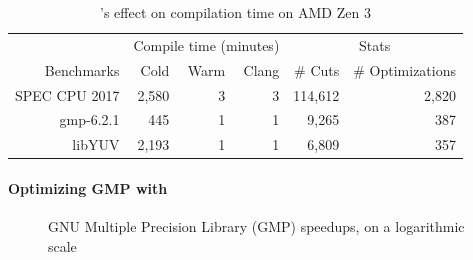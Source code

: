 \begin{table}[t]
  \centering
  \caption{\minotaur's effect on compilation time on AMD Zen 3}
  \begin{tabular}{r | r r r | r r}

    & \multicolumn{3}{c|}{Compile time (minutes)} & \multicolumn{2}{c}{Stats} \\
    Benchmarks & Cold & Warm & Clang & \# Cuts & \# Optimizations \\
    \hline
    SPEC CPU 2017 & 2,580 & 3 & 3 & 114,612 & 2,820 \\
    gmp-6.2.1 &  445 & 1 & 1 & 9,265 & 387\\
    libYUV  & 2,193 & 1 & 1 & 6,809 & 357 \\

  \end{tabular}
  \label{tab:compiletime}
\end{table}


\paragraph{Optimizing GMP with \minotaur{}}

\begin{figure}[tbp]
  \centering
  \hfill
  \caption{GNU Multiple Precision Library (GMP) speedups, on a logarithmic scale}
  \label{fig:gmp}
\end{figure}


